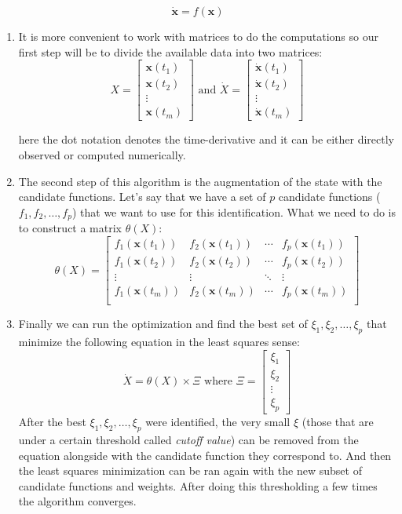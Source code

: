 \documentclass[12pt, letterpaper]{article}
\begin{document}
\begin{equation}\label{eq:diff}
\dot{\mathbf{x}} = f(\mathbf{x})
\end{equation}



\begin{enumerate}
	\item It is more convenient to work with matrices to do the computations so our first step will be to divide the available data into two matrices:
	$$X = 
	\begin{bmatrix}
	\mathbf{x}(t_1) \\
	\mathbf{x}(t_2) \\
	\vdots \\
	\mathbf{x}(t_m)
	\end{bmatrix}
	\text{ and }
	\dot{X} =
	\begin{bmatrix}
	\dot{\mathbf{x}}(t_1) \\
	\dot{\mathbf{x}}(t_2) \\
	\vdots \\
	\dot{\mathbf{x}}(t_m)
	\end{bmatrix}
	$$

	here the dot notation denotes the time-derivative and it can be either directly observed or computed numerically.

	\item The second step of this algorithm is the augmentation of the state with the candidate functions. Let's say that we have a set of $p$ candidate functions ($f_1, f_2, \dots, f_p$) that we want to use for this identification. What we need to do is to construct a matrix $\theta(X)$:
	$$\theta(X) = 
	\begin{bmatrix}
	f_1(\mathbf{x}(t_1)) & f_2(\mathbf{x}(t_1)) & \cdots & f_p(\mathbf{x}(t_1))\\
	f_1(\mathbf{x}(t_2)) & f_2(\mathbf{x}(t_2)) & \cdots & f_p(\mathbf{x}(t_2))\\
	\vdots & \vdots  & \ddots & \vdots\\
	f_1(\mathbf{x}(t_m)) & f_2(\mathbf{x}(t_m)) & \cdots & f_p(\mathbf{x}(t_m))\\
	\end{bmatrix}
	$$

	\item Finally we can run the optimization and find the best set of $\xi_1, \xi_2, \dots, \xi_p$ that minimize the following equation in the least squares sense:
	$$\dot{X} = \theta(X) \times \Xi \text{ where } \Xi = 
	\begin{bmatrix}
	\xi_1 \\
	\xi_2 \\
	\vdots \\
	\xi_p
	\end{bmatrix}
	$$
	After the best $\xi_1, \xi_2, \dots, \xi_p$ were identified, the very small $\xi$ (those that are under a certain threshold called {\em cutoff value}) can be removed from the equation alongside with the candidate function they correspond to. And then the least squares minimization can be ran again with the new subset of candidate functions and weights. After doing this thresholding a few times the algorithm converges.

\end{enumerate}
\end{document}
